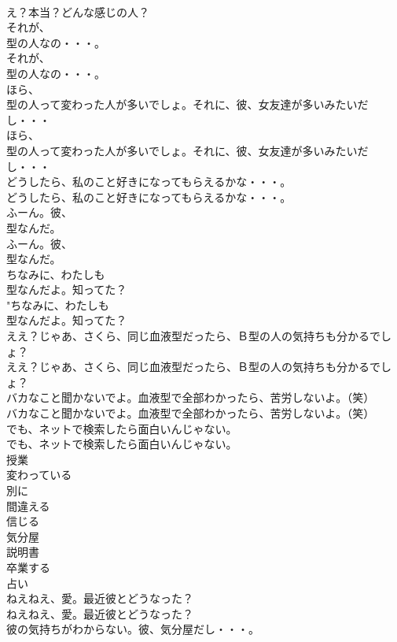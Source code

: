 \documentclass[8pt]{extreport}
\begin{document}
\begin{CJK}{UTF8}{min}
\\	え？本当？どんな感じの人？ 
\\	それが、
\\	型の人なの・・・。	
\\	それが、
\\	型の人なの・・・。 
\\	ほら、
\\	型の人って変わった人が多いでしょ。それに、彼、女友達が多いみたいだし・・・	
\\	ほら、
\\	型の人って変わった人が多いでしょ。それに、彼、女友達が多いみたいだし・・・ 
\\	どうしたら、私のこと好きになってもらえるかな・・・。	
\\	どうしたら、私のこと好きになってもらえるかな・・・。 
\\	ふーん。彼、
\\	型なんだ。	
\\	ふーん。彼、
\\	型なんだ。 
\\	ちなみに、わたしも
\\	型なんだよ。知ってた？	
\\	"ちなみに、わたしも
\\	型なんだよ。知ってた？ 
\\	ええ？じゃあ、さくら、同じ血液型だったら、Ｂ型の人の気持ちも分かるでしょ？	
\\	ええ？じゃあ、さくら、同じ血液型だったら、Ｂ型の人の気持ちも分かるでしょ？ 
\\	バカなこと聞かないでよ。血液型で全部わかったら、苦労しないよ。（笑）	
\\	バカなこと聞かないでよ。血液型で全部わかったら、苦労しないよ。（笑） 
\\	でも、ネットで検索したら面白いんじゃない。	
\\	でも、ネットで検索したら面白いんじゃない。 
\\	授業
\\	変わっている
\\	別に
\\	間違える
\\	信じる
\\	気分屋
\\	説明書
\\	卒業する
\\	占い
\\	ねえねえ、愛。最近彼とどうなった？	
\\	ねえねえ、愛。最近彼とどうなった？ 
\\	彼の気持ちがわからない。彼、気分屋だし・・・。	

\end{CJK}
\end{document}
